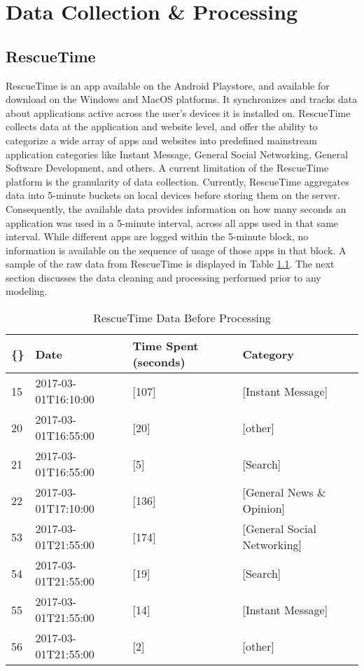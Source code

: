 \chapter{Data Collection \& Processing} \label{data}
\section{RescueTime}
RescueTime is an app available on the Android Playstore, and available for download on the Windows and MacOS platforms. It synchronizes and tracks data about applications active across the user's devices it is installed on. RescueTime collects data at the application and website level, and offer the ability to categorize a wide array of apps and websites into predefined mainstream application categories like Instant Message, General Social Networking, General Software Development, and others. A current limitation of the RescueTime platform is the granularity of data collection. Currently, RescueTime aggregates data into 5-minute buckets on local devices before storing them on the server. Consequently, the available data provides information on how many seconds an application was used in a 5-minute interval, across all apps used in that same interval. While different apps are logged within the 5-minute block, no information is available on the sequence of usage of those apps in that block. A sample of the raw data from RescueTime is displayed in Table \ref{dirtydata}. The next section discusses the data cleaning and processing performed prior to any modeling.

\begin{table}
\centering
\caption{RescueTime Data Before Processing}
\label{dirtydata}
\begin{tabular}{llll}
\hline
\{\} &                 Date & Time Spent (seconds) &                     Category \\
\hline
15 &  2017-03-01T16:10:00 &                [107] &            [Instant Message] \\
20 &  2017-03-01T16:55:00 &                 [20] &                      [other] \\
21 &  2017-03-01T16:55:00 &                  [5] &                     [Search] \\
22 &  2017-03-01T17:10:00 &                [136] &     [General News \& Opinion] \\
53 &  2017-03-01T21:55:00 &                [174] &  [General Social Networking] \\
54 &  2017-03-01T21:55:00 &                 [19] &                     [Search] \\
55 &  2017-03-01T21:55:00 &                 [14] &            [Instant Message] \\
56 &  2017-03-01T21:55:00 &                  [2] &                      [other] \\

\hline
\end{tabular}
\end{table}

